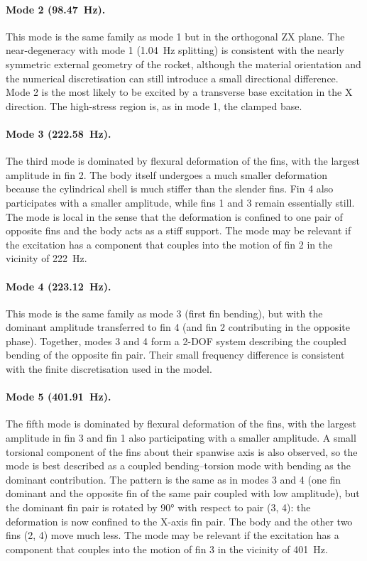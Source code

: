 \paragraph{Mode 2 (\SI{98.47}{\hertz}).} This mode is the same family as mode 1 but in the orthogonal ZX plane. The near-degeneracy with mode 1 (\SI{1.04}{\hertz} splitting) is consistent with the nearly symmetric external geometry of the rocket, although the material orientation and the numerical discretisation can still introduce a small directional difference. Mode 2 is the most likely to be excited by a transverse base excitation in the X direction. The high-stress region is, as in mode 1, the clamped base.

\paragraph{Mode 3 (\SI{222.58}{\hertz}).} The third mode is dominated by flexural deformation of the fins, with the largest amplitude in fin 2. The body itself undergoes a much smaller deformation because the cylindrical shell is much stiffer than the slender fins. Fin 4 also participates with a smaller amplitude, while fins 1 and 3 remain essentially still. The mode is local in the sense that the deformation is confined to one pair of opposite fins and the body acts as a stiff support. The mode may be relevant if the excitation has a component that couples into the motion of fin 2 in the vicinity of \SI{222}{\hertz}.

\paragraph{Mode 4 (\SI{223.12}{\hertz}).} This mode is the same family as mode 3 (first fin bending), but with the dominant amplitude transferred to fin 4 (and fin 2 contributing in the opposite phase). Together, modes 3 and 4 form a 2-DOF system describing the coupled bending of the opposite fin pair. Their small frequency difference is consistent with the finite discretisation used in the model.

\paragraph{Mode 5 (\SI{401.91}{\hertz}).} The fifth mode is dominated by flexural deformation of the fins, with the largest amplitude in fin 3 and fin 1 also participating with a smaller amplitude. A small torsional component of the fins about their spanwise axis is also observed, so the mode is best described as a coupled bending--torsion mode with bending as the dominant contribution. The pattern is the same as in modes 3 and 4 (one fin dominant and the opposite fin of the same pair coupled with low amplitude), but the dominant fin pair is rotated by \ang{90} with respect to pair (3, 4): the deformation is now confined to the X-axis fin pair. The body and the other two fins (2, 4) move much less. The mode may be relevant if the excitation has a component that couples into the motion of fin 3 in the vicinity of \SI{401}{\hertz}.

